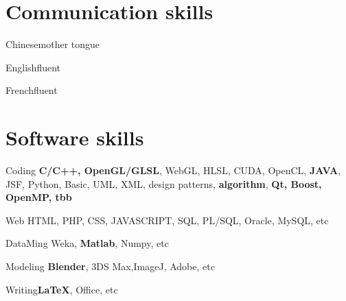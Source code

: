 \documentclass{tccv}
\begin{document}
%
%
%
%
%
%
%

\section{Communication skills}
\begin{factlist}
\item{Chinese}{mother tongue}
\item{English}{fluent}
\item{French}{fluent}
\end{factlist}

\section{Software skills}

\begin{factlist}

\item{Coding}
     {\textbf{C/C++, OpenGL/GLSL}, WebGL, HLSL, CUDA, OpenCL, \textbf{JAVA}, JSF, Python, Basic, UML, 
XML, design patterns, \textbf{algorithm}, \textbf{Qt, Boost, OpenMP, tbb}}

\item{Web}
     {HTML, PHP, CSS, JAVASCRIPT, SQL, PL/SQL, Oracle, MySQL, etc}

\item{DataMing}
     {Weka, \textbf{Matlab}, Numpy, etc}
		
\item{Modeling}
     {\textbf{Blender}, 3DS Max,ImageJ, Adobe, etc}	

\item{Writing}{\textbf{\LaTeX}, Office, etc}

\end{factlist}
\end{document}
